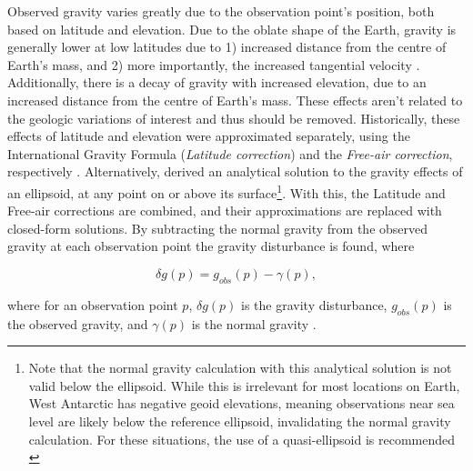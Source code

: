 Observed gravity varies greatly due to the observation point's position, both based on latitude and elevation. Due to the oblate shape of the Earth, gravity is generally lower at low latitudes due to 1) increased distance from the centre of Earth's mass, and 2) more importantly, the increased tangential velocity \citep{jacobygravity2009}. Additionally, there is a decay of gravity with increased elevation, due to an increased distance from the centre of Earth's mass. These effects aren't related to the geologic variations of interest and thus should be removed. Historically, these effects of latitude and elevation were approximated separately, using the International Gravity Formula (\textit{Latitude correction}) and the \textit{Free-air correction}, respectively \citep{hinzenew2005}. Alternatively, \citet{liellipsoid2001} derived an analytical solution to the gravity effects of an ellipsoid, at any point on or above its surface\footnote{Note that the normal gravity calculation with this analytical solution is not valid below the ellipsoid. While this is irrelevant for most locations on Earth, West Antarctic has negative geoid elevations, meaning observations near sea level are likely below the reference ellipsoid, invalidating the normal gravity calculation. For these situations, the use of a quasi-ellipsoid is recommended \citep{vajdagravity2008, paštekaunderstanding2017}}. With this, the Latitude and Free-air corrections are combined, and their approximations are replaced with closed-form solutions. By subtracting the normal gravity from the observed gravity at each observation point the gravity disturbance is found, where

\begin{equation} \label{disturbance}
    \delta g(p) = g_{obs}(p) - \gamma(p),
\end{equation}

\noindent
where for an observation point $p$, $\delta g(p)$ is the gravity disturbance, $g_{obs}(p)$ is the observed gravity, and $\gamma(p)$ is the normal gravity \citep{paštekaunderstanding2017}. \\

